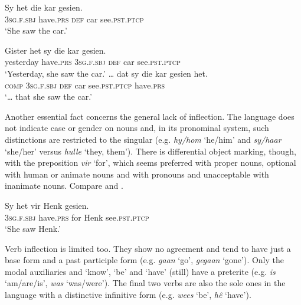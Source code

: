 \documentclass[output=paper,colorlinks,citecolor=brown]{langscibook}
\begin{document}
\ea\label{ex:afr:1}
    
    \ea\label{ex:afr:1a}
        \gll Sy het die kar gesien. \\ 
             \textsc{3sg.f.sbj} have.\textsc{prs} \textsc{def} car see.\textsc{pst.ptcp} \\
        \glt ‘She saw the car.’
    
    \ex\label{ex:afr:1b}
        \gll Gister het sy die kar gesien. \\
             yesterday  have.\textsc{prs} \textsc{3sg.f.sbj} \textsc{def} car  see.\textsc{pst.ptcp} \\
        \glt ‘Yesterday, she saw the car.’
    \ex\label{ex:afr:1c}
        \gll … dat sy die kar gesien het. \\
             {} \textsc{comp} \textsc{3sg.f.sbj} \textsc{def} car  see.\textsc{pst.ptcp} have.\textsc{prs}\\
        \glt ‘… that she saw the car.’ 
    \z
\z 


Another essential fact concerns the general lack of inflection. The language does not indicate case or gender on nouns and, in its pronominal system, such distinctions are restricted to the singular (e.g. \textit{hy/hom} ‘he/him’ and \textit{sy/haar} ‘she/her’ versus \textit{hulle} ‘they, them’). There is differential object marking, though, with the preposition \textit{vir} ‘for’, which seems preferred with proper nouns, optional with human or animate nouns and with pronouns and unacceptable with inanimate nouns. Compare  and .

\ea\label{ex:afr:2}
    \gll Sy het vir Henk gesien. \\ 
         3\textsc{sg.f.sbj} have.\textsc{prs} for Henk see.\textsc{pst.ptcp} \\
    \glt ‘She saw Henk.’
\z 


Verb inflection is limited too. They show no agreement and tend to have just a base form and a past participle form (e.g. \textit{gaan} ‘go’, \textit{gegaan} ‘gone’). Only the modal auxiliaries and ‘know’, ‘be’ and ‘have’ (still) have a preterite (e.g. \textit{is} ‘am/are/is’, \textit{was} ‘was/were’). The final two verbs are also the sole ones in the language with a distinctive infinitive form (e.g. \textit{wees} ‘be’, \textit{hê} ‘have’).
\end{document}
